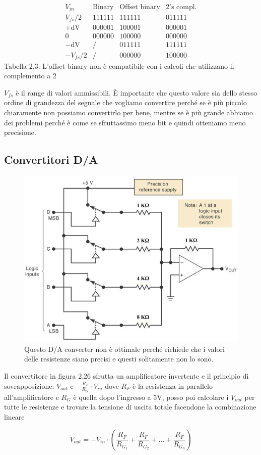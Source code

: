 \documentclass[
]{book}
\begin{document}
\[\begin{array}{c|c|c|c}V_{in}&\text{Binary}&\text{Offset binary}&\text{2's compl.}\\\hline V_{fs}/2&111111&111111&011111\\+\text{dV}&000001&100001&000001\\0&000000&100000&000000\\-\text{dV}&/&011111&111111\\-V_{fs}/2&/&000000&100000\end{array}\]
Tabella 2.3: L'offset binary non è compatibile con i calcoli che
utilizzano il complemento a 2

\(V_{fs}\) è il range di valori ammissibili. È importante che questo
valore sia dello stesso ordine di grandezza del segnale che vogliamo
convertire perché se è più piccolo chiaramente non possiamo convertirlo
per bene, mentre se è più grande abbiamo dei problemi perché è come se
sfruttassimo meno bit e quindi otteniamo meno precisione.

\subsection{Convertitori D/A}\label{convertitori-da}

\begin{figure}
\centering
\includegraphics[width=0.4\linewidth,height=\textheight,keepaspectratio]{immagini/41.png}
\caption{Questo D/A converter non è ottimale perché richiede che i
valori delle resistenze siano precisi e questi solitamente non lo sono.}
\end{figure}

Il convertitore in figura 2.26 sfrutta un amplificatore invertente e il
principio di sovrapposizione: \(V_{out}\) e
\(-\frac{R_{F}}{R_{G}}\cdot V_{in}\) dove \(R_{F}\) è la resistenza in
parallelo all'amplificatore e \(R_{G}\) è quella dopo l'ingresso a 5V,
posso poi calcolare i \(V_{out}\) per tutte le resistenze e trovare la
tensione di uscita totale facendone la combinazione lineare

\[V_{out}=-V_{in}\cdot\left(\frac{R_{F}}{R_{G_{1}}}+\frac{R_{F}}{R_{G_{2}}}+...+
\frac{R_{F}}{R_{G_{n}}}\right)\]
\end{document}
